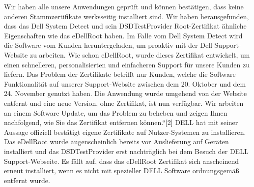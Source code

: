 Wir haben alle unsere Anwendungen geprüft und können bestätigen, dass keine anderen Stammzertifikate werksseitig installiert sind. Wir haben herausgefunden, dass das Dell System Detect und sein DSDTestProvider Root-Zertifikat ähnliche Eigenschaften wie das eDellRoot haben. Im Falle vom Dell System Detect wird die Software vom Kunden heruntergeladen, um proaktiv mit der Dell Support-Website zu arbeiten. Wie schon eDellRoot, wurde dieses Zertifikat entwickelt, um einen schnelleren, personalisierten und einfacheren Support für unsere Kunden zu liefern. Das Problem der Zertifikate betrifft nur Kunden, welche die Software Funktionalität auf unserer Support-Website zwischen dem 20. Oktober und dem 24. November genutzt haben. Die Anwendung wurde umgehend von der Website entfernt und eine neue Version, ohne Zertifikat, ist nun verfügbar. Wir arbeiten an einem Software Update, um das Problem zu beheben und zeigen Ihnen nachfolgend, wie Sie das Zertifikat entfernen können.“[2]
DELL hat mit seiner Aussage offiziell bestätigt eigene Zertifikate auf Nutzer-Systemen zu installieren. Das eDellRoot wurde augenscheinlich bereits vor Auslieferung auf Geräten installiert und das DSDTestProvider erst nachträglich bei dem Besuch der DELL Support-Webseite. Es fällt auf, dass das eDellRoot Zertifikat sich anscheinend erneut installiert, wenn es nicht mit spezieller DELL Software ordnungsgemäß entfernt wurde. 